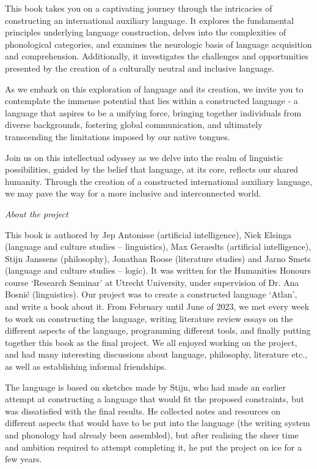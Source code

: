 This book takes you on a captivating journey through the intricacies of constructing an international auxiliary language. It explores the fundamental principles underlying language construction, delves into the complexities of phonological categories, and examines the neurologic basis of language acquisition and comprehension. Additionally, it investigates the challenges and opportunities presented by the creation of a culturally neutral and inclusive language. 

As we embark on this exploration of language and its creation, we invite you to contemplate the immense potential that lies within a constructed language - a language that aspires to be a unifying force, bringing together individuals from diverse backgrounds, fostering global communication, and ultimately transcending the limitations imposed by our native tongues. 

Join us on this intellectual odyssey as we delve into the realm of linguistic possibilities, guided by the belief that language, at its core, reflects our shared humanity. Through the creation of a constructed international auxiliary language, we may pave the way for a more inclusive and interconnected world. 

 

    \textit{About the project} 

This book is authored by Jep Antonisse (artificial intelligence), Niek Elsinga (language and culture studies – linguistics), Max Geraedts (artificial intelligence), Stijn Janssens (philosophy), Jonathan Roose (literature studies) and Jarno Smets (language and culture studies – logic). It was written for the Humanities Honours course ‘Research Seminar’ at Utrecht University, under supervision of Dr. Ana Bosnić (linguistics). Our project was to create a constructed language ‘Atlan’, and write a book about it. From February until June of 2023, we met every week to work on constructing the language, writing literature review essays on the different aspects of the language, programming different tools, and finally putting together this book as the final project. We all enjoyed working on the project, and had many interesting discussions about language, philosophy, literature etc., as well as establishing informal friendships. 

The language is based on sketches made by Stijn, who had made an earlier attempt at constructing a language that would fit the proposed constraints, but was dissatisfied with the final results. He collected notes and resources on different aspects that would have to be put into the language (the writing system and phonology had already been assembled), but after realising the sheer time and ambition required to attempt completing it, he put the project on ice for a few years.  

